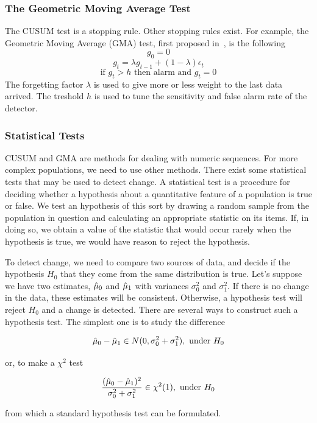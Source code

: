 \subsubsection{The Geometric Moving Average Test}
\label{Ssgma}
The CUSUM test is a stopping rule. Other stopping rules exist. For example, the Geometric Moving Average (GMA) test,
first proposed in~\cite{Roberts}, is the following
$$g_0=0$$
$$g_t= \lambda g_{t-1}+ ( 1- \lambda) \epsilon_t$$
$$\mbox{if } g_t>h \mbox{ then alarm and } g_t=0$$
The forgetting factor $\lambda$ is used to give more or less weight to the last data arrived.
The treshold $h$ is used to tune the sensitivity and false alarm rate %
of the detector.


\subsubsection{Statistical Tests}
\label{Ssstatic}

CUSUM and GMA are methods for dealing with numeric sequences. For more complex populations,
we need to use other methods.
There exist some statistical tests that may be used to detect change.
A statistical test is a procedure for deciding whether a hypothesis 
about a quantitative feature of a population is true or false. We test 
an hypothesis of this sort by drawing a random sample from the population
 in question and calculating an appropriate statistic on its items. 
If, in doing so, we obtain a value of the statistic that would occur
 rarely when the hypothesis is true, we would have reason to reject the hypothesis. 

To detect change, we need to compare two sources of data, and decide if
the hypothesis $H_0$ that they come from the same distribution is true. 
Let's suppose we have two estimates, $\hat{\mu}_0$ and $\hat{\mu}_1$ with variances
$\sigma_0^2$ and $\sigma_1^2$. If there is no change in the data, 
these estimates will be consistent. Otherwise, a hypothesis test will
reject $H_0$ and a change is detected. There are several ways to construct
such a hypothesis test. The simplest one is to study the difference

$$ \hat{\mu}_0 - \hat{\mu}_1 \in N(0, \sigma_0^2+ \sigma_1^2), \mbox{ under } H_0$$

or, to make a $\chi^ 2$ test

$$ \frac{(\hat{\mu}_0 - \hat{\mu}_1)^ 2}{\sigma_0^2+ \sigma_1^2} \in \chi^ 2(1), \mbox{ under } H_0$$

from which a standard hypothesis test can be formulated. 

